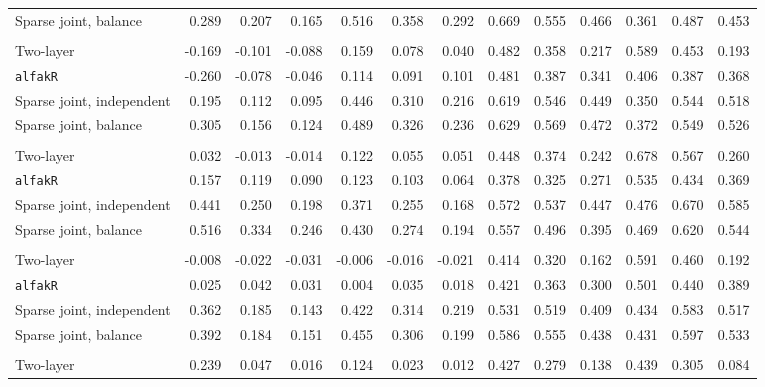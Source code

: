 \begin{center}
\begin{tabular}{l*{12}{r}}
\quad Sparse joint, balance & 0.289 & 0.207 & 0.165 & 0.516 & 0.358 & 0.292 & 0.669 & 0.555 & 0.466 & 0.361 & 0.487 & 0.453 \\
\addlinespace[2pt]
\multicolumn{13}{l}{\textit{500/700, 360 d}} \\
\quad Two-layer & -0.169 & -0.101 & -0.088 & 0.159 & 0.078 & 0.040 & 0.482 & 0.358 & 0.217 & 0.589 & 0.453 & 0.193 \\
\quad \texttt{alfakR} & -0.260 & -0.078 & -0.046 & 0.114 & 0.091 & 0.101 & 0.481 & 0.387 & 0.341 & 0.406 & 0.387 & 0.368 \\
\quad Sparse joint, independent & 0.195 & 0.112 & 0.095 & 0.446 & 0.310 & 0.216 & 0.619 & 0.546 & 0.449 & 0.350 & 0.544 & 0.518 \\
\quad Sparse joint, balance & 0.305 & 0.156 & 0.124 & 0.489 & 0.326 & 0.236 & 0.629 & 0.569 & 0.472 & 0.372 & 0.549 & 0.526 \\
\addlinespace[2pt]
\multicolumn{13}{l}{\textit{500/700, 1080 d}} \\
\quad Two-layer & 0.032 & -0.013 & -0.014 & 0.122 & 0.055 & 0.051 & 0.448 & 0.374 & 0.242 & 0.678 & 0.567 & 0.260 \\
\quad \texttt{alfakR} & 0.157 & 0.119 & 0.090 & 0.123 & 0.103 & 0.064 & 0.378 & 0.325 & 0.271 & 0.535 & 0.434 & 0.369 \\
\quad Sparse joint, independent & 0.441 & 0.250 & 0.198 & 0.371 & 0.255 & 0.168 & 0.572 & 0.537 & 0.447 & 0.476 & 0.670 & 0.585 \\
\quad Sparse joint, balance & 0.516 & 0.334 & 0.246 & 0.430 & 0.274 & 0.194 & 0.557 & 0.496 & 0.395 & 0.469 & 0.620 & 0.544 \\
\addlinespace[2pt]
\multicolumn{13}{l}{\textit{500/700, bottleneck}} \\
\quad Two-layer & -0.008 & -0.022 & -0.031 & -0.006 & -0.016 & -0.021 & 0.414 & 0.320 & 0.162 & 0.591 & 0.460 & 0.192 \\
\quad \texttt{alfakR} & 0.025 & 0.042 & 0.031 & 0.004 & 0.035 & 0.018 & 0.421 & 0.363 & 0.300 & 0.501 & 0.440 & 0.389 \\
\quad Sparse joint, independent & 0.362 & 0.185 & 0.143 & 0.422 & 0.314 & 0.219 & 0.531 & 0.519 & 0.409 & 0.434 & 0.583 & 0.517 \\
\quad Sparse joint, balance & 0.392 & 0.184 & 0.151 & 0.455 & 0.306 & 0.199 & 0.586 & 0.555 & 0.438 & 0.431 & 0.597 & 0.533 \\
\addlinespace[2pt]
\multicolumn{13}{l}{\textit{100/3000, 360 d}} \\
\quad Two-layer & 0.239 & 0.047 & 0.016 & 0.124 & 0.023 & 0.012 & 0.427 & 0.279 & 0.138 & 0.439 & 0.305 & 0.084 \\

\end{tabular}
\end{center}
